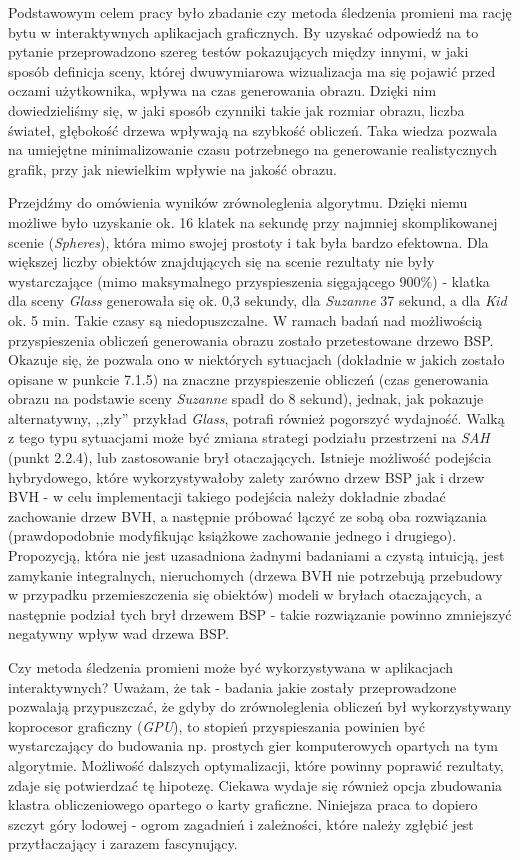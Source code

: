 Podstawowym celem pracy było zbadanie czy metoda śledzenia promieni ma rację bytu w interaktywnych aplikacjach graficznych. By uzyskać odpowiedź na to pytanie przeprowadzono szereg testów pokazujących między innymi, w jaki sposób definicja sceny, której dwuwymiarowa wizualizacja ma się pojawić przed oczami użytkownika, wpływa na czas generowania obrazu. Dzięki nim dowiedzieliśmy się, w jaki sposób czynniki takie jak rozmiar obrazu, liczba świateł, głębokość drzewa wpływają na szybkość obliczeń. Taka wiedza pozwala na umiejętne minimalizowanie czasu potrzebnego na generowanie realistycznych grafik, przy jak niewielkim wpływie na jakość obrazu.

Przejdźmy do omówienia wyników zrównoleglenia algorytmu. Dzięki niemu możliwe było uzyskanie ok. 16 klatek na sekundę przy najmniej skomplikowanej scenie (\emph{Spheres}), która mimo swojej prostoty i tak była bardzo efektowna. Dla większej liczby obiektów znajdujących się na scenie rezultaty nie były wystarczające (mimo maksymalnego przyspieszenia sięgającego 900\%) - klatka dla sceny \emph{Glass} generowała się ok. 0,3 sekundy, dla \emph{Suzanne} 37 sekund, a dla \emph{Kid} ok. 5 min. Takie czasy są niedopuszczalne. W ramach badań nad możliwością przyspieszenia obliczeń generowania obrazu zostało przetestowane drzewo BSP. Okazuje się, że pozwala ono w niektórych sytuacjach (dokładnie w jakich zostało opisane w punkcie 7.1.5) na znaczne przyspieszenie obliczeń (czas generowania obrazu na podstawie sceny \emph{Suzanne} spadł do 8 sekund), jednak, jak pokazuje alternatywny, ,,zły'' przykład \emph{Glass}, potrafi również pogorszyć wydajność. Walką z tego typu sytuacjami może być zmiana strategi podziału przestrzeni na \emph{SAH} (punkt 2.2.4), lub zastosowanie brył otaczających. Istnieje możliwość podejścia hybrydowego, które wykorzystywałoby zalety zarówno drzew BSP jak i drzew BVH - w celu implementacji takiego podejścia należy dokładnie zbadać zachowanie drzew BVH, a następnie próbować łączyć ze sobą oba rozwiązania (prawdopodobnie modyfikując książkowe zachowanie jednego i drugiego). Propozycją, która nie jest uzasadniona żadnymi badaniami a czystą intuicją, jest zamykanie integralnych, nieruchomych (drzewa BVH nie potrzebują przebudowy w przypadku przemieszczenia się obiektów) modeli w bryłach otaczających, a następnie podział tych brył drzewem BSP - takie rozwiązanie powinno zmniejszyć negatywny wpływ wad drzewa BSP.

Czy metoda śledzenia promieni może być wykorzystywana w aplikacjach interaktywnych? Uważam, że tak - badania jakie zostały przeprowadzone pozwalają przypuszczać, że gdyby do zrównoleglenia obliczeń był wykorzystywany koprocesor graficzny (\emph{GPU}), to stopień przyspieszania powinien być wystarczający do budowania np. prostych gier komputerowych opartych na tym algorytmie. Możliwość dalszych optymalizacji, które powinny poprawić rezultaty, zdaje się potwierdzać tę hipotezę. Ciekawa wydaje się również opcja zbudowania klastra obliczeniowego opartego o karty graficzne. Niniejsza praca to dopiero szczyt góry lodowej - ogrom zagadnień i zależności, które należy zgłębić jest przytłaczający i zarazem fascynujący. 